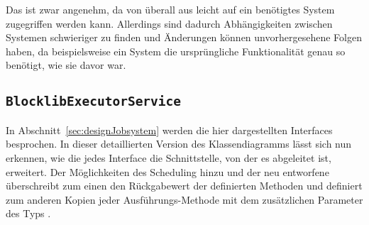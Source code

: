 Das ist zwar angenehm, da von überall aus leicht auf ein benötigtes System zugegriffen werden kann. Allerdings sind dadurch Abhängigkeiten zwischen Systemen schwieriger zu finden und Änderungen können unvorhergesehene Folgen haben, da beispielsweise ein System die ursprüngliche Funktionalität genau so benötigt, wie sie davor war. 

\clearpage
\subsection{\texttt{BlocklibExecutorService}}\label{appendix:BlocklibExecutorService}
{
	\centering
	
	\par
}
In Abschnitt~\vref{sec:designJobsystem} werden die hier dargestellten Interfaces besprochen. In dieser detaillierten Version des Klassendiagramms lässt sich nun erkennen, wie die jedes Interface die Schnittstelle, von der es abgeleitet ist, erweitert. Der \classScheduledExecutorService{} Möglichkeiten des Scheduling hinzu und der neu entworfene \classBlocklibExecutorService{} überschreibt zum einen den Rückgabewert der definierten Methoden und definiert zum anderen Kopien jeder Ausführungs-Methode mit dem zusätzlichen Parameter  des Typs \classTaskPriority{}.

\clearpage
